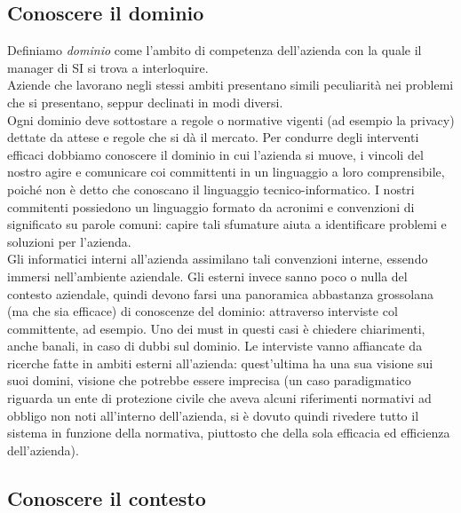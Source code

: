 \subsection{Conoscere il dominio}
Definiamo \textit{dominio} come l'ambito di competenza dell'azienda con la quale
il manager di SI si trova a interloquire. \\
Aziende che lavorano negli stessi ambiti presentano simili peculiarit\`a  nei
problemi che si presentano, seppur declinati in modi diversi. \\
Ogni dominio deve sottostare a regole o normative vigenti (ad esempio la
privacy) dettate da attese e regole che si d\`a il mercato. Per condurre degli
interventi efficaci dobbiamo conoscere il dominio in cui l'azienda si muove, i
vincoli del nostro agire e comunicare coi committenti in un linguaggio a loro
comprensibile, poich\'e non \`e detto che conoscano il linguaggio
tecnico-informatico.
I nostri commitenti possiedono un linguaggio formato da acronimi e convenzioni
di  significato su parole comuni: capire tali sfumature aiuta a identificare
problemi e soluzioni per l'azienda. \\
Gli informatici interni all'azienda assimilano tali convenzioni interne, essendo
immersi nell'ambiente aziendale. Gli esterni invece sanno poco o nulla del
contesto aziendale, quindi devono farsi una panoramica abbastanza grossolana
(ma che sia efficace) di conoscenze del dominio: attraverso interviste col
committente, ad esempio. Uno dei must in questi casi \`e chiedere chiarimenti,
anche banali, in caso di dubbi sul dominio. Le interviste vanno  affiancate da
ricerche fatte in ambiti esterni all'azienda:  quest'ultima ha una sua visione
sui suoi domini, visione che potrebbe  essere imprecisa (un caso paradigmatico
riguarda un ente di protezione civile che aveva alcuni riferimenti normativi ad
obbligo non noti all'interno dell'azienda, si \`e dovuto quindi rivedere tutto
il sistema in funzione della normativa, piuttosto che della sola  efficacia ed
efficienza dell'azienda).

\subsection{Conoscere il contesto}

